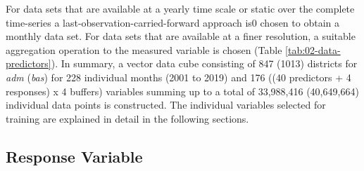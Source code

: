 \documentclass[a4paper,11pt]{article}
\begin{document}
For data sets that are available at a yearly time scale or static over the complete
time-series a last-observation-carried-forward approach is0 chosen to obtain
a monthly data set. For data sets that are available at a finer resolution,
a suitable aggregation operation to the measured variable is chosen
(Table \ref{tab:02-data-predictors}). In summary, a vector data cube consisting
of 847 (1013) districts for \emph{adm} (\emph{bas}) for 228 individual months (2001 to 2019)
and 176 ((40 predictors + 4 responses) x 4 buffers) variables summing up to a
total of 33,988,416 (40,649,664) individual data points is constructed. The
individual variables selected for training are explained in detail in the following
sections.

\hypertarget{response-variable}{%
\subsection{Response Variable}\label{response-variable}}
\end{document}
